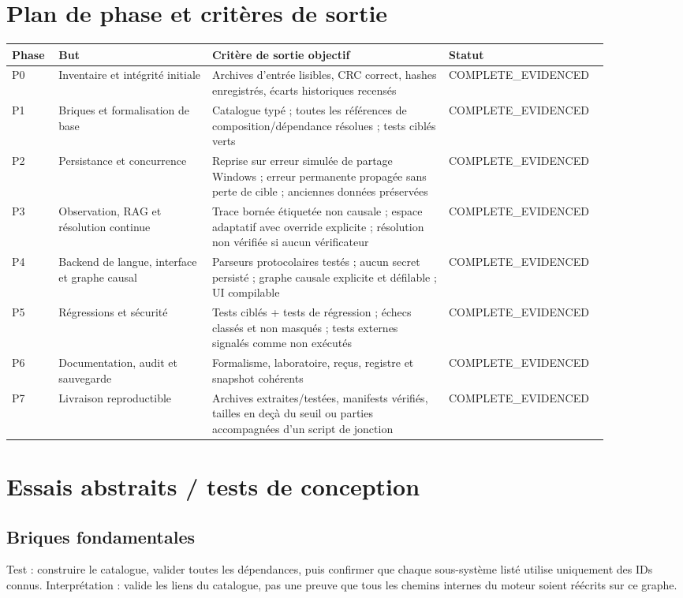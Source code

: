 \documentclass[11pt,a4paper]{article}
\begin{document}
\section{Plan de phase et critères de sortie}
\begin{longtable}{p{0.07\linewidth}p{0.24\linewidth}p{0.37\linewidth}p{0.20\linewidth}}
\toprule
Phase & But & Critère de sortie objectif & Statut \\
\midrule
P0 & Inventaire et intégrité initiale & Archives d'entrée lisibles, CRC correct, hashes enregistrés, écarts historiques recensés & COMPLETE_EVIDENCED \\
P1 & Briques et formalisation de base & Catalogue typé ; toutes les références de composition/dépendance résolues ; tests ciblés verts & COMPLETE_EVIDENCED \\
P2 & Persistance et concurrence & Reprise sur erreur simulée de partage Windows ; erreur permanente propagée sans perte de cible ; anciennes données préservées & COMPLETE_EVIDENCED \\
P3 & Observation, RAG et résolution continue & Trace bornée étiquetée non causale ; espace adaptatif avec override explicite ; résolution non vérifiée si aucun vérificateur & COMPLETE_EVIDENCED \\
P4 & Backend de langue, interface et graphe causal & Parseurs protocolaires testés ; aucun secret persisté ; graphe causale explicite et défilable ; UI compilable & COMPLETE_EVIDENCED \\
P5 & Régressions et sécurité & Tests ciblés + tests de régression ; échecs classés et non masqués ; tests externes signalés comme non exécutés & COMPLETE_EVIDENCED \\
P6 & Documentation, audit et sauvegarde & Formalisme, laboratoire, reçus, registre et snapshot cohérents & COMPLETE_EVIDENCED \\
P7 & Livraison reproductible & Archives extraites/testées, manifests vérifiés, tailles en deçà du seuil ou parties accompagnées d'un script de jonction & COMPLETE_EVIDENCED \\
\bottomrule
\end{longtable}

\section{Essais abstraits / tests de conception}
\subsection{Briques fondamentales}
Test : construire le catalogue, valider toutes les dépendances, puis confirmer que chaque sous-système listé utilise uniquement des IDs connus. Interprétation : valide les liens du catalogue, pas une preuve que tous les chemins internes du moteur soient réécrits sur ce graphe.
\end{document}
